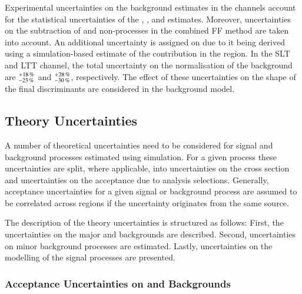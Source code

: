 Experimental uncertainties on the \faketauhadvis background estimates in the
\lephad channels account for the statistical uncertainties of the \FFqcd,
\FFttbar, and \rqcd estimates. Moreover, uncertainties on the subtraction of
\ttbar and non-\ttbar processes in the combined FF method are taken into
account. An additional uncertainty is assigned on \rqcd due to it being derived
using a simulation-based estimate of the \ttbarFakes contribution in the \antiid
region. In the \lephad SLT and LTT channel, the total uncertainty on the
normalisation of the \faketauhadvis background are
$^{\hspace{0.25pt}+\hspace{0.25pt}18\,\%}_{-23\,\%}$ and
$^{\hspace{0.25pt}+\hspace{0.25pt}28\,\%}_{-30\,\%}$, respectively. The effect
of these uncertainties on the shape of the final discriminants are considered in
the background model.



\subsection{Theory Uncertainties}%
\label{sec:modelling_uncertainties}%
\label{sec:theory_uncertainties}

A number of theoretical uncertainties need to be considered for signal and
background processes estimated using simulation. For a given process these
uncertainties are split, where applicable, into uncertainties on the cross
section and uncertainties on the acceptance due to analysis
selections. Generally, acceptance uncertainties for a given signal or background
process are assumed to be correlated across regions if the uncertainty
originates from the same source.

The description of the theory uncertainties is structured as follows: First, the
uncertainties on the major \ZHF and \ttbar backgrounds are described. Second,
uncertainties on minor background processes are estimated. Lastly, uncertainties
on the modelling of the signal processes are presented.


\subsubsection{Acceptance Uncertainties on \ZHF and \ttbar Backgrounds}


